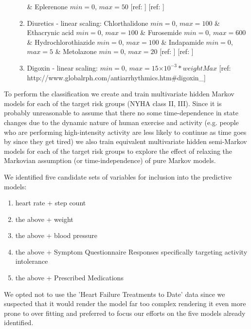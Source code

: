 \documentclass[]{article}
\providecommand{\e}[1]{\ensuremath{\times 10^{#1}}}  %
\begin{document}
\begin{enumerate}
\begin{enumerate}
		\& Eplerenone \(min = 0\), \(max = 50\) [ref: ] [ref: ]
		\item Diuretics - linear scaling: Chlorthalidone \(min = 0\), \(max = 100\) 
		\& Ethacrynic acid \(min = 0\), \(max = 100\) 
		\& Furosemide \(min = 0\), \(max = 600\) 
		\& Hydrochlorothiazide \(min = 0\), \(max = 100\) 
		\& Indapamide \(min = 0\), \(max = 5\) 
		\& Metolazone \(min = 0\), \(max = 20\)  [ref: ] [ref: ]
		\item Digoxin - linear scaling: \(min = 0\), \(max = 15\e{-3} *weightMax\) [ref: http://www.globalrph.com/antiarrhythmics.htm\#digoxin\_]
	\end{enumerate} 
\end{enumerate}

To perform the classification we create and train multivariate hidden Markov models for each of the target risk groups (NYHA class II, III). Since it is probably unreasonable to assume that there no some time-dependence in state changes due to the dynamic nature of human exercise and activity (e.g. people who are performing high-intensity activity are less likely to continue as time goes by since they get tired) we also train equivalent multivariate hidden semi-Markov models for each of the target risk groups to explore the effect of relaxing the Markovian assumption (or time-independence) of pure Markov models.

We identified five candidate sets of variables for inclusion into the predictive models:
\begin{enumerate}
	\item heart rate + step count
	\item the above + weight
	\item the above + blood pressure
	\item the above + Symptom Questionnaire Responses specifically targeting activity intolerance
	\item the above + Prescribed Medications
\end{enumerate}

We opted not to use the 'Heart Failure Treatments to Date' data since we suspected that it would render the model far too complex rendering it even more prone to over fitting and preferred to focus our efforts on the five models already identified.
\end{document}
